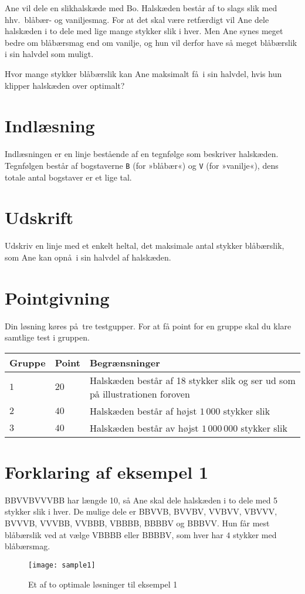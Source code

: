 
Ane vil dele en slikhalskæde med Bo.
Halskæden består af to slags slik med hhv.\ blåbær- og vaniljesmag.
For at det skal være retfærdigt vil Ane dele halskæden i to dele med lige mange stykker slik i hver.
Men Ane synes meget bedre om blåbærsmag end om vanilje, og hun vil derfor have så meget blåbærslik i sin halvdel som muligt.

Hvor mange stykker blåbærslik kan Ane maksimalt få i sin halvdel, hvis hun klipper halskæden over optimalt?

\section*{Indlæsning}

Indlæsningen er en linje bestående af en tegnfølge som beskriver halskæden.
Tegnfølgen består af bogstaverne \texttt{B} (for »blåbær«) og \texttt{V} (for »vanilje«), dens totale antal bogstaver er et lige tal.

\section*{Udskrift}
Udskriv en linje med et enkelt heltal, det maksimale antal stykker blåbærslik, som Ane kan opnå i sin halvdel af halskæden.

\section*{Pointgivning}

Din løsning køres på tre testgupper.
For at få point for en gruppe skal du klare samtlige test i gruppen.

\noindent
\begin{tabular}{ l  l  l }
Gruppe & Point & Begrænsninger \\ \hline
$1$   & $20$       & Halskæden består af 18 stykker slik og ser ud som på illustrationen foroven \\ 
$2$   & $40$       & Halskæden består af højst $1\,000$ stykker slik\\ 
$3$   & $40$       & Halskæden består av højst $1\,000\,000$ stykker slik
\end{tabular}

\section*{Forklaring af eksempel 1}

BBVVBVVVBB har længde 10, så Ane skal dele halskæden i to dele med 5 stykker slik i hver.
De mulige dele er BBVVB, BVVBV, VVBVV, VBVVV, BVVVB, VVVBB, VVBBB, VBBBB, BBBBV og BBBVV.
Hun får mest blåbærslik ved at vælge VBBBB eller BBBBV, som hver har $4$ stykker med blåbærsmag.

\begin{figure}[h]
	\centering
\texttt{[image: sample1]}
\caption{Et af to optimale løsninger til eksempel 1}
\end{figure}
